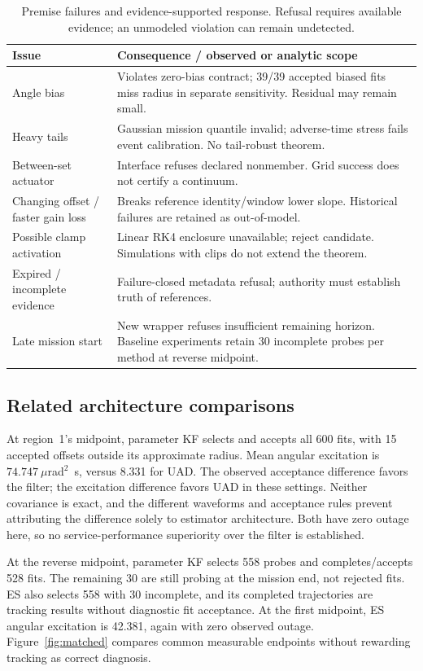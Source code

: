 \begin{table}[t]
\caption{Premise failures and evidence-supported response. Refusal requires available evidence; an unmodeled violation can remain undetected.}
\centering\footnotesize
\begin{tabular}{@{}p{}p{}@{}}\toprule
Issue & Consequence / observed or analytic scope\\\midrule
Angle bias & Violates zero-bias contract; 39/39 accepted biased fits miss radius in separate sensitivity. Residual may remain small.\\
Heavy tails & Gaussian mission quantile invalid; adverse-time stress fails event calibration. No tail-robust theorem.\\
Between-set actuator & Interface refuses declared nonmember. Grid success does not certify a continuum.\\
Changing offset / faster gain loss & Breaks reference identity/window lower slope. Historical failures are retained as out-of-model.\\
Possible clamp activation & Linear RK4 enclosure unavailable; reject candidate. Simulations with clips do not extend the theorem.\\
Expired / incomplete evidence & Failure-closed metadata refusal; authority must establish truth of references.\\
Late mission start & New wrapper refuses insufficient remaining horizon. Baseline experiments retain 30 incomplete probes per method at reverse midpoint.\\\bottomrule
\end{tabular}
\label{tab:violations}
\end{table}

\subsection{Related architecture comparisons}
At region~1's midpoint, parameter KF selects and accepts all 600 fits, with 15 accepted offsets outside its approximate radius. Mean angular excitation is $74.747\ \mu$rad$^2$~s, versus 8.331 for UAD. The observed acceptance difference favors the filter; the excitation difference favors UAD in these settings. Neither covariance is exact, and the different waveforms and acceptance rules prevent attributing the difference solely to estimator architecture. Both have zero outage here, so no service-performance superiority over the filter is established.

At the reverse midpoint, parameter KF selects 558 probes and completes/accepts 528 fits. The remaining 30 are still probing at the mission end, not rejected fits. ES also selects 558 with 30 incomplete, and its completed trajectories are tracking results without diagnostic fit acceptance. At the first midpoint, ES angular excitation is 42.381, again with zero observed outage. Figure~\ref{fig:matched} compares common measurable endpoints without rewarding tracking as correct diagnosis.

